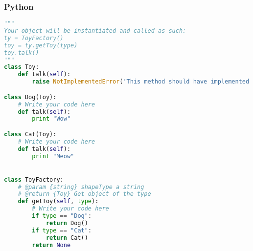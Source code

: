 \subsubsection{Python}
\begin{lstlisting}[language=Python]
"""
Your object will be instantiated and called as such:
ty = ToyFactory()
toy = ty.getToy(type)
toy.talk()
"""
class Toy:
    def talk(self):
        raise NotImplementedError('This method should have implemented.')

class Dog(Toy):
    # Write your code here
    def talk(self):
        print "Wow"

class Cat(Toy):
    # Write your code here
    def talk(self):
        print "Meow"


class ToyFactory:
    # @param {string} shapeType a string
    # @return {Toy} Get object of the type
    def getToy(self, type):
        # Write your code here
        if type == "Dog":
            return Dog()
        if type == "Cat":
            return Cat()
        return None
\end{lstlisting} 
\normalsize 
